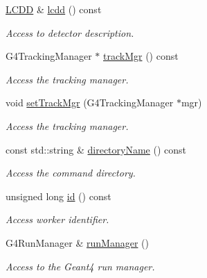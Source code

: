 \begin{DoxyCompactItemize}
\hyperlink{class_d_d4hep_1_1_geometry_1_1_l_c_d_d}{LCDD} \& \hyperlink{class_d_d4hep_1_1_simulation_1_1_geant4_kernel_a172f416447f9f1aa4a1a166b0df902a3}{lcdd} () const 
\begin{DoxyCompactList}\small\item\em Access to detector description. \item\end{DoxyCompactList}\item 
G4TrackingManager $\ast$ \hyperlink{class_d_d4hep_1_1_simulation_1_1_geant4_kernel_a4cef97fec68194bc070962cefc05d17c}{trackMgr} () const 
\begin{DoxyCompactList}\small\item\em Access the tracking manager. \item\end{DoxyCompactList}\item 
void \hyperlink{class_d_d4hep_1_1_simulation_1_1_geant4_kernel_aa5d1173163b58ade76d90a6a449b2357}{setTrackMgr} (G4TrackingManager $\ast$mgr)
\begin{DoxyCompactList}\small\item\em Access the tracking manager. \item\end{DoxyCompactList}\item 
const std::string \& \hyperlink{class_d_d4hep_1_1_simulation_1_1_geant4_kernel_aa30888e16596794250fb32e545ff78bb}{directoryName} () const 
\begin{DoxyCompactList}\small\item\em Access the command directory. \item\end{DoxyCompactList}\item 
unsigned long \hyperlink{class_d_d4hep_1_1_simulation_1_1_geant4_kernel_ac15d27b4d51308d7eeab4c18702513d1}{id} () const 
\begin{DoxyCompactList}\small\item\em Access worker identifier. \item\end{DoxyCompactList}\item 
G4RunManager \& \hyperlink{class_d_d4hep_1_1_simulation_1_1_geant4_kernel_aa01093467efb9b3a4f9179ba22ac7899}{runManager} ()
\begin{DoxyCompactList}\small\item\em Access to the Geant4 run manager. \item\end{DoxyCompactList}\item 

\end{DoxyCompactItemize}
